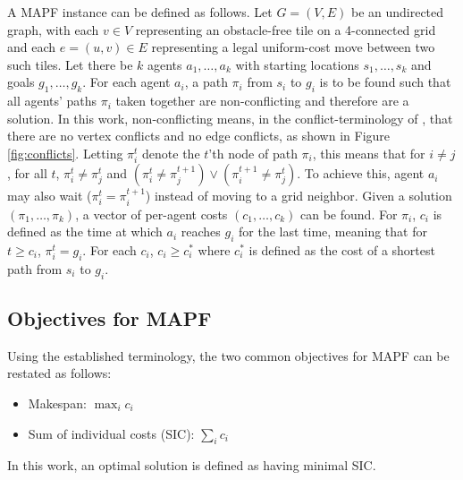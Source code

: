 \documentclass[english]{article}
\begin{document}
	A MAPF instance can be defined as follows. Let $G = (V,E)$ be an undirected graph, with each $v\in V$ representing an obstacle-free tile on a 4-connected grid and each $e = (u,v)\in E$ representing a legal uniform-cost move between two such tiles. Let there be $k$ agents $a_1,\ldots,a_k$ with starting locations $s_1,\ldots,s_k$ and goals $g_1,\ldots,g_k$. For each agent $a_i$, a path $\pi_i$ from $s_i$ to $g_i$ is to be found such that all agents' paths $\pi_i$ taken together are non-conflicting and therefore are a solution. In this work, non-conflicting means, in the conflict-terminology of \cite{stern2019}, that there are no vertex conflicts and no edge conflicts, as shown in Figure \ref{fig:conflicts}. Letting $\pi_i^t$ denote the $t$'th node of path $\pi_i$, this means that for $i\neq j$, for all $t$, $\pi_i^t\neq \pi_j^t$ and $(\pi_i^t \neq \pi_j^{t + 1})\lor(\pi_i^{t+1} \neq \pi_j^t)$. To achieve this, agent $a_i$ may also wait ($\pi_i^t = \pi_i^{t+1}$) instead of moving to a grid neighbor. Given a solution $(\pi_1,\ldots,\pi_k)$, a vector of per-agent costs $(c_1,\ldots,c_k)$ can be found. For $\pi_i$, $c_i$ is defined as the time at which $a_i$ reaches $g_i$ for the last time, meaning that for $t \geq c_i$, $\pi_i^{t} = g_i$. 
	For each $c_i$, $c_i \geq c^*_i$ where $c^*_i$ is defined as the cost of a shortest path from $s_i$ to $g_i$. 
	\subsection{Objectives for MAPF}
	 
	Using the established terminology, the two common objectives for MAPF can be restated as follows:
	\begin{itemize}
		\item Makespan: $\max_{i} c_i$
		\item Sum of individual costs (SIC): $\sum_i c_i$
	\end{itemize}
	In this work, an optimal solution is defined as having minimal SIC.
	
\end{document}
